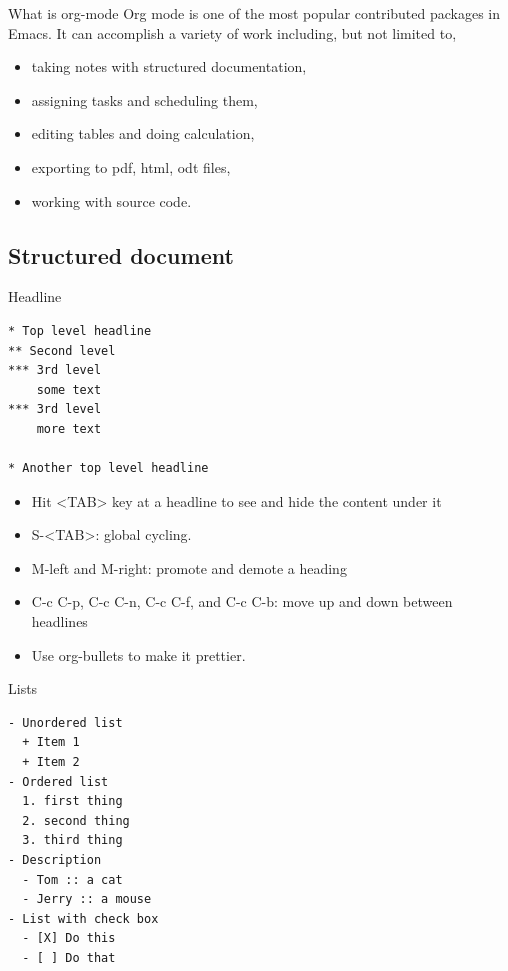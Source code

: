 \documentclass[presentation]{beamer}
\begin{document}
\begin{frame}[label={sec:org655b048}]{What is org-mode}
Org mode is one of the most popular contributed packages in Emacs. It
can accomplish a variety of work including, but not limited to,

\begin{itemize}
\item taking notes with structured documentation,
\item assigning tasks and scheduling them,
\item editing tables and doing calculation,
\item exporting to pdf, html, odt files,
\item \alert{working with source code}.
\end{itemize}
\end{frame}


\subsection*{Structured document}
\label{sec:orga05ef52}

\begin{frame}[fragile,label={sec:org2b70a3f}]{Headline}
 \begin{verbatim}
* Top level headline
** Second level
*** 3rd level
    some text
*** 3rd level
    more text

* Another top level headline
\end{verbatim}

\begin{itemize}
\item Hit <TAB> key at a headline to see and hide the content under it
\item S-<TAB>: global cycling.
\item M-left and M-right: promote and demote a heading
\item C-c C-p, C-c C-n, C-c C-f, and C-c C-b: move up and down between
headlines
\item Use org-bullets to make it prettier.
\end{itemize}
\end{frame}

\begin{frame}[fragile,label={sec:orgae52a35}]{Lists}
 \begin{verbatim}
- Unordered list
  + Item 1
  + Item 2
- Ordered list
  1. first thing
  2. second thing
  3. third thing
- Description
  - Tom :: a cat
  - Jerry :: a mouse
- List with check box
  - [X] Do this
  - [ ] Do that
\end{verbatim}
\end{frame}
\end{document}
